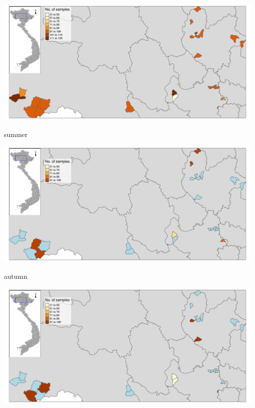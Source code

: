 \begin{frame}
\begin{center}
\includegraphics[width=1\textwidth]{map02.pdf}
\end{center}
\end{frame}

\begin{frame}
summer\\
\begin{center}
\includegraphics[width=1\textwidth]{map02_summer.pdf}
\end{center}
\end{frame}


\begin{frame}
autumn\\
\begin{center}
\includegraphics[width=1\textwidth]{map02_autumn.pdf}
\end{center}
\end{frame}

